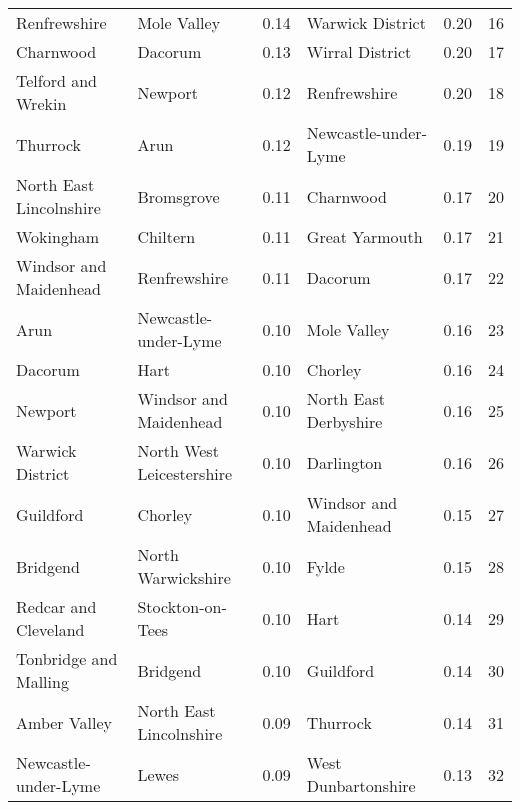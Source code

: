 \begin{tabular}{llrlrr}
Renfrewshire              &                Mole Valley &  0.14 &           Warwick District &    0.20 &    16 \\
Charnwood                 &                    Dacorum &  0.13 &            Wirral District &    0.20 &    17 \\
Telford and Wrekin        &                    Newport &  0.12 &               Renfrewshire &    0.20 &    18 \\
Thurrock                  &                       Arun &  0.12 &       Newcastle-under-Lyme &    0.19 &    19 \\
North East Lincolnshire   &                 Bromsgrove &  0.11 &                  Charnwood &    0.17 &    20 \\
Wokingham                 &                   Chiltern &  0.11 &             Great Yarmouth &    0.17 &    21 \\
Windsor and Maidenhead    &               Renfrewshire &  0.11 &                    Dacorum &    0.17 &    22 \\
Arun                      &       Newcastle-under-Lyme &  0.10 &                Mole Valley &    0.16 &    23 \\
Dacorum                   &                       Hart &  0.10 &                    Chorley &    0.16 &    24 \\
Newport                   &     Windsor and Maidenhead &  0.10 &      North East Derbyshire &    0.16 &    25 \\
Warwick District          &  North West Leicestershire &  0.10 &                 Darlington &    0.16 &    26 \\
Guildford                 &                    Chorley &  0.10 &     Windsor and Maidenhead &    0.15 &    27 \\
Bridgend                  &         North Warwickshire &  0.10 &                      Fylde &    0.15 &    28 \\
Redcar and Cleveland      &           Stockton-on-Tees &  0.10 &                       Hart &    0.14 &    29 \\
Tonbridge and Malling     &                   Bridgend &  0.10 &                  Guildford &    0.14 &    30 \\
Amber Valley              &    North East Lincolnshire &  0.09 &                   Thurrock &    0.14 &    31 \\
Newcastle-under-Lyme      &                      Lewes &  0.09 &        West Dunbartonshire &    0.13 &    32 \\

\end{tabular}
